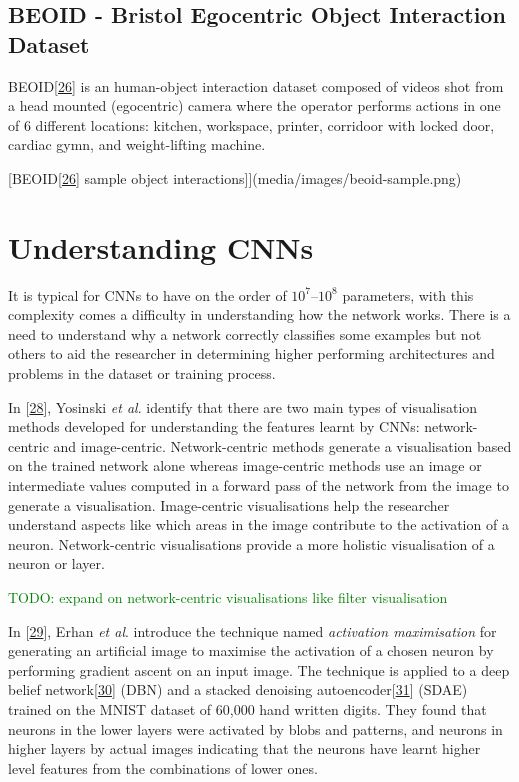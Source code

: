 \documentclass[A4paper,draft]{scrreprt}
\newcommand{\etal}{\textit{et al}.}
\begin{document}
\subsection{BEOID - Bristol Egocentric Object Interaction
Dataset}\label{beoid---bristol-egocentric-object-interaction-dataset}

BEOID{[}\protect\hyperlink{ref-_BristolEgocentricObject}{26}{]} is an
human-object interaction dataset composed of videos shot from a head
mounted (egocentric) camera where the operator performs actions in one
of 6 different locations: kitchen, workspace, printer, corridoor with
locked door, cardiac gymn, and weight-lifting machine.

{[}BEOID{[}\protect\hyperlink{ref-_BristolEgocentricObject}{26}{]}
sample object interactions{]}{]}(media/images/beoid-sample.png)

\section{Understanding CNNs}\label{sec:background:understanding}

It is typical for CNNs to have on the order of \(10^7\)--\(10^8\)
parameters, with this complexity comes a difficulty in understanding how
the network works. There is a need to understand why a network correctly
classifies some examples but not others to aid the researcher in
determining higher performing architectures and problems in the dataset
or training process.

In
{[}\protect\hyperlink{ref-yosinski2015_UnderstandingNeuralNetworks}{28}{]},
Yosinski \etal{} identify that there are two main types of visualisation
methods developed for understanding the features learnt by CNNs:
network-centric and image-centric. Network-centric methods generate a
visualisation based on the trained network alone whereas image-centric
methods use an image or intermediate values computed in a forward pass
of the network from the image to generate a visualisation. Image-centric
visualisations help the researcher understand aspects like which areas
in the image contribute to the activation of a neuron. Network-centric
visualisations provide a more holistic visualisation of a neuron or
layer.

\textcolor{green}{TODO: expand on network-centric visualisations like filter visualisation}\newline

In
{[}\protect\hyperlink{ref-erhan2009_VisualizingHigherLayerFeatures}{29}{]},
Erhan \etal{} introduce the technique named \emph{activation
maximisation} for generating an artificial image to maximise the
activation of a chosen neuron by performing gradient ascent on an input
image. The technique is applied to a deep belief
network{[}\protect\hyperlink{ref-hinton2009_Deepbeliefnetworks}{30}{]}
(DBN) and a stacked denoising
autoencoder{[}\protect\hyperlink{ref-vincent2010_StackedDenoisingAutoencoders}{31}{]}
(SDAE) trained on the MNIST dataset of 60,000 hand written digits. They
found that neurons in the lower layers were activated by blobs and
patterns, and neurons in higher layers by actual images indicating that
the neurons have learnt higher level features from the combinations of
lower ones.
\end{document}
